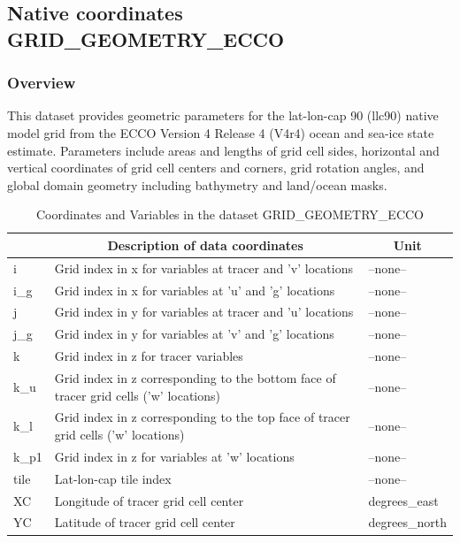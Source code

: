 \subsection{Native coordinates GRID\_GEOMETRY\_ECCO}
\newp
\subsubsection{Overview}
This dataset provides geometric parameters for the lat-lon-cap 90 (llc90) native model grid from the ECCO Version 4 Release 4 (V4r4) ocean and sea-ice state estimate. Parameters include areas and lengths of grid cell sides, horizontal and vertical coordinates of grid cell centers and corners, grid rotation angles, and global domain geometry including bathymetry and land/ocean masks. 
\begin{longtable}{|m{}|m{}|m{}|}
\caption{Coordinates and Variables in the dataset GRID\_GEOMETRY\_ECCO}
\label{tab:table-GRID_GEOMETRY_ECCO-fields} \\ 
\hline \endhead \hline \endfoot
\rowcolor{lightgray} \multicolumn{1}{|c|}{\textbf{Coordinates}} & \multicolumn{1}{|c|}{\textbf{Description of data coordinates}} &  \multicolumn{1}{|c|}{\textbf{Unit}}\\ \hline
i &Grid index in x for variables at tracer and 'v' locations &--none--  \\ \hline
i\_g &Grid index in x for variables at 'u' and 'g' locations &--none--  \\ \hline
j &Grid index in y for variables at tracer and 'u' locations &--none--  \\ \hline
j\_g &Grid index in y for variables at 'v' and 'g' locations &--none--  \\ \hline
k &Grid index in z for tracer variables &--none--  \\ \hline
k\_u &Grid index in z corresponding to the bottom face of tracer grid cells ('w' locations) &--none--  \\ \hline
k\_l &Grid index in z corresponding to the top face of tracer grid cells ('w' locations) &--none--  \\ \hline
k\_p1 &Grid index in z for variables at 'w' locations &--none--  \\ \hline
tile &Lat-lon-cap tile index &--none--  \\ \hline
XC &Longitude of tracer grid cell center &degrees\_east  \\ \hline
YC &Latitude of tracer grid cell center &degrees\_north  \\ \hline

\end{longtable}
